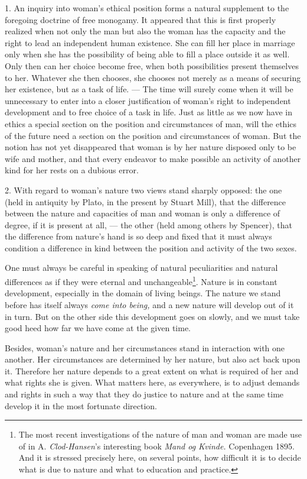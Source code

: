 \documentclass[12pt,a4paper,openany]{book}
\newcommand{\opage}[1]{\marginnote{\footnotesize\textit{[#1]}}}
\begin{document}
1. An inquiry into woman's ethical position forms a natural supplement to the foregoing doctrine of free monogamy. It
appeared that this is first properly realized when not only the man but also the woman has the capacity and the right to
lead
\opage{311}an independent human existence. She can fill her place in marriage only when she has the possibility of being
able to fill a place outside it as well. Only then can her choice become free, when both possibilities present
themselves to her. Whatever she then chooses, she chooses not merely as a means of securing her existence, but as a task
of life. --- The time will surely come when it will be unnecessary to enter into a closer justification of woman's right
to independent development and to free choice of a task in life. Just as little as we now have in ethics a special
section on the position and circumstances of man, will the ethics of the future need a section on the position and
circumstances of woman. But the notion has not yet disappeared that woman is by her nature disposed only to be wife and
mother, and that every endeavor to make possible an activity of another kind for her rests on a dubious error.

2. With regard to woman's nature two views stand sharply opposed: the one (held in antiquity by Plato, in the present by
Stuart Mill), that the difference between the nature and capacities of man and woman is only a difference of degree, if
it is present at all, --- the other (held among others by Spencer), that the difference from nature's hand is so deep
and fixed that it must always condition a difference in kind between the position and activity of the two sexes.

One must always be careful in speaking of natural peculiarities and natural differences as if they were eternal and
unchangeable\footnote[1]{The most recent investigations of the nature of man and woman are made use of in A.
\emph{Clod-Hansen}'s interesting book \textit{Mand og Kvinde.} Copenhagen 1895. And it is stressed precisely here, on
several points, how difficult it is to decide what is due to nature and what to education and practice.}. Nature is in
constant development, especially in the domain of living beings. The nature we stand before has itself always
\textit{come into being,} and a new nature will develop out of it in turn. But on the other side this development goes
on slowly, and we must take good heed how far we have come at the given time.

\opage{312}Besides, woman's nature and her circumstances stand in interaction with one another. Her circumstances are
determined by her nature, but also act back upon it. Therefore her nature depends to a great extent on what is required
of her and what rights she is given. What matters here, as everywhere, is to adjust demands and rights in such a way that
they do justice to nature and at the same time develop it in the most fortunate direction.
\end{document}
